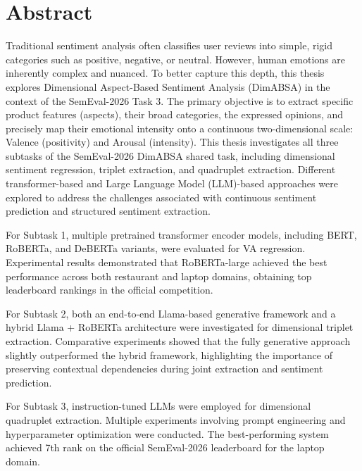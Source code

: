\documentclass{article}
\begin{document}
\hypersetup{pageanchor=false} 

\clearpage
\hypersetup{pageanchor=true} 

\section*{Abstract}

\large

Traditional sentiment analysis often classifies user reviews into simple, rigid categories such as positive, negative, or neutral. However, human emotions are inherently complex and nuanced. To better capture this depth, this thesis explores Dimensional Aspect-Based Sentiment Analysis (DimABSA) in the context of the SemEval-2026 Task 3. The primary objective is to extract specific product features (aspects), their broad categories, the expressed opinions, and precisely map their emotional intensity onto a continuous two-dimensional scale: Valence (positivity) and Arousal (intensity).
This thesis investigates all three subtasks of the SemEval-2026 DimABSA shared task, including dimensional sentiment regression, triplet extraction, and quadruplet extraction. Different transformer-based and Large Language Model (LLM)-based approaches were explored to address the challenges associated with continuous sentiment prediction and structured sentiment extraction.

For Subtask 1, multiple pretrained transformer encoder models, including BERT, RoBERTa, and DeBERTa variants, were evaluated for VA regression. Experimental results demonstrated that RoBERTa-large achieved the best performance across both restaurant and laptop domains, obtaining top leaderboard rankings in the official competition.

For Subtask 2, both an end-to-end Llama-based generative framework and a hybrid Llama + RoBERTa architecture were investigated for dimensional triplet extraction. Comparative experiments showed that the fully generative approach slightly outperformed the hybrid framework, highlighting the importance of preserving contextual dependencies during joint extraction and sentiment prediction.

For Subtask 3, instruction-tuned LLMs were employed for dimensional quadruplet extraction. Multiple experiments involving prompt engineering and hyperparameter optimization were conducted. The best-performing system achieved 7th rank on the official SemEval-2026 leaderboard for the laptop domain.
\end{document}
